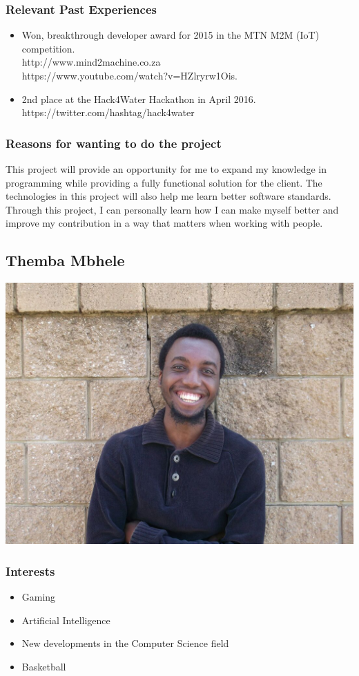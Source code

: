 \documentclass[a4paper,12pt]{article}
\begin{document}
\subsubsection{Relevant Past Experiences}
\begin{itemize}
\item Won, breakthrough developer award for 2015 in the MTN M2M (IoT) competition.\\
http://www.mind2machine.co.za \\
https://www.youtube.com/watch?v=HZlryrw1Ois.
\item 2nd place at the Hack4Water Hackathon in April 2016.\\
https://twitter.com/hashtag/hack4water
\end{itemize}
\subsubsection{Reasons for wanting to do the project}
This project will provide an opportunity for me to expand my knowledge in programming while providing a fully functional solution for the client. The technologies in this project will also help me learn better software standards. Through this project, I can personally learn how I can make myself better and improve my contribution in a way that matters when working with people.
\newpage
\subsection{Themba Mbhele}
\includegraphics[width=\textwidth]{images/Themba.jpg}
\subsubsection{Interests}
\begin{itemize}
    \item Gaming
    \item Artificial Intelligence
    \item New developments in the Computer Science field
    \item Basketball
\end{itemize}
\end{document}
